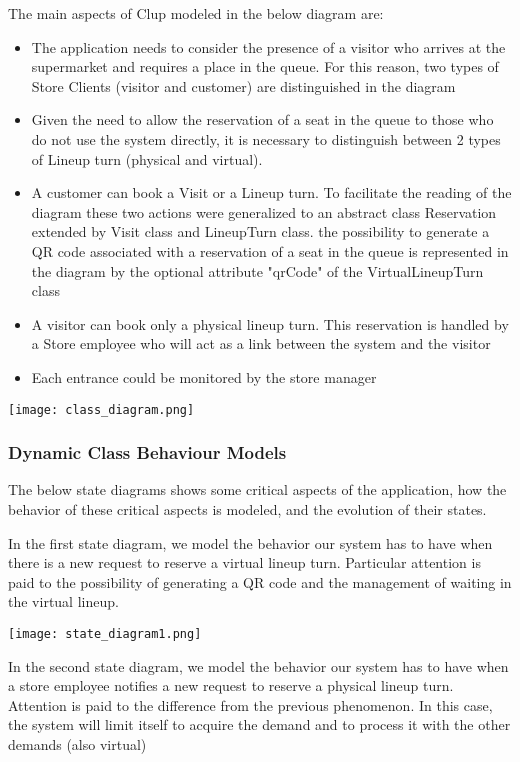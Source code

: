 The main aspects of Clup modeled in the below diagram are:
\begin{itemize}
    \item The application needs to consider the presence of a visitor who arrives at the supermarket and requires a place in the queue. For this reason, two types of Store Clients (visitor and customer) are distinguished in the diagram
    \item Given the need to allow the reservation of a seat in the queue to those who do not use the system directly, it is necessary to distinguish between 2 types of Lineup turn (physical and virtual).
    \item A customer can book a Visit or a Lineup turn. To facilitate the reading of the diagram these two actions were generalized to an abstract class Reservation extended by Visit class and LineupTurn class. the possibility to generate a QR code associated with a reservation of a seat in the queue is represented in the diagram by the optional attribute "qrCode" of the VirtualLineupTurn class
    \item A visitor can book only a physical lineup turn. This reservation is handled by a Store employee who will act as a link between the system and the visitor
    \item Each entrance could be monitored by the store manager
\end{itemize}
\texttt{[image: class\_diagram.png]}


\subsubsection{Dynamic Class Behaviour Models}
The below state diagrams shows some critical aspects of the application, how the behavior of these critical aspects is modeled, and the evolution of their states.

\medskip
In the first state diagram, we model the behavior our system has to have when there is a new request to reserve a virtual lineup turn. Particular attention is paid to the possibility of generating a QR code and the management of waiting in the virtual lineup.

\medskip
\texttt{[image: state\_diagram1.png]}

\medskip
In the second state diagram, we model the behavior our system has to have when a store employee notifies a new request to reserve a physical lineup turn. Attention is paid to the difference from the previous phenomenon. In this case, the system will limit itself to acquire the demand and to process it with the other demands (also virtual)

